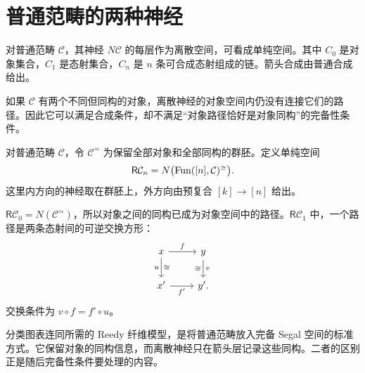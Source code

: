 \section{普通范畴的两种神经}
\begin{example}[离散神经]
对普通范畴 $\mathcal C$，其神经 $N\mathcal C$ 的每层作为离散空间，可看成单纯空间。其中 $C_0$ 是对象集合，$C_1$ 是态射集合，$C_n$ 是 $n$ 条可合成态射组成的链。箭头合成由普通合成给出。
\end{example}
\begin{remark}
如果 $\mathcal C$ 有两个不同但同构的对象，离散神经的对象空间内仍没有连接它们的路径。因此它可以满足合成条件，却不满足“对象路径恰好是对象同构”的完备性条件。
\end{remark}
\begin{definition}[分类图表]
对普通范畴 $\mathcal C$，令 $\mathcal C^\simeq$ 为保留全部对象和全部同构的群胚。定义单纯空间
\[
\mathsf{R}\mathcal C_n
=N\bigl(\operatorname{Fun}([n],\mathcal C)^\simeq\bigr).
\]
这里内方向的神经取在群胚上，外方向由预复合 $[k]\to[n]$ 给出。
\end{definition}
\begin{example}
$\mathsf{R}\mathcal C_0=N(\mathcal C^\simeq)$，所以对象之间的同构已成为对象空间中的路径。$\mathsf{R}\mathcal C_1$ 中，一个路径是两条态射间的可逆交换方形：
\[
\begin{tikzcd}
x\ar[r,"f"]\ar[d,"u"',"\cong"]&y\ar[d,"v","\cong"']\\
x'\ar[r,"f'"']&y'.
\end{tikzcd}
\]
交换条件为 $v\circ f=f'\circ u$。
\end{example}
\begin{remark}
分类图表连同所需的 Reedy 纤维模型，是将普通范畴放入完备 Segal 空间的标准方式。它保留对象的同构信息，而离散神经只在箭头层记录这些同构。二者的区别正是随后完备性条件要处理的内容\cite{Rezk}。
\end{remark}

